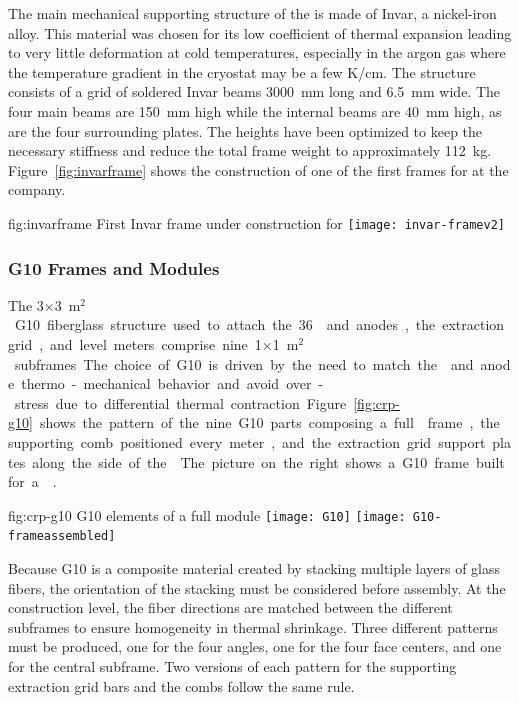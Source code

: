 The main mechanical supporting structure of the  is made of Invar, a nickel-iron alloy. This material was chosen for its low coefficient of thermal expansion leading to very little deformation at cold temperatures, especially in the argon gas where the temperature gradient in the cryostat may be a few \si{K/cm}.
The structure consists of a grid of soldered Invar beams \SI{3000}{mm} long and \SI{6.5}{mm} wide. The four main beams are \SI{150}{mm} high while the internal beams are \SI{40}{mm} high, as are the four surrounding plates. The heights have been optimized to keep the necessary stiffness and reduce the total frame weight to approximately \SI{112}{kg}.
 Figure~\ref{fig:invarframe} shows the construction of one of the first  frames for  at the company.
\begin{dunefigure}{fig:invarframe}
{First  Invar frame under construction for }
\texttt{[image: invar-framev2]}
\end{dunefigure}
 \subsubsection{G10 Frames and Modules}
\label{sec:invar-frame}

The \num{3}$\times$\SI{3}{m$^{2}$}  G10 fiberglass structure used to attach the \num{36}  and anodes, the extraction grid, and level meters comprise nine \num{1}$\times$\SI{1}{m$^{2}$} subframes. The choice of G10 is driven by the need to match the  and anode thermo-mechanical behavior and avoid over-stress due to differential thermal contraction. 
Figure~\ref{fig:crp-g10} shows the pattern of the nine G10 parts composing a full  frame, the supporting comb positioned every meter, and the extraction grid support plates along the side of the . The picture on the right shows a G10 frame built for a  .

\begin{dunefigure}{fig:crp-g10}
{G10 elements of a full  module}
\texttt{[image: G10]}
\texttt{[image: G10-frameassembled]}
\end{dunefigure}

Because G10 is a composite material created by stacking multiple layers of glass fibers, the orientation of the stacking must be considered before assembly.
At the construction level, the fiber directions are matched between the different subframes to ensure homogeneity in thermal shrinkage. Three different patterns must be produced, one for the four angles, one for the four face centers, and one for the central subframe.
Two versions of each pattern for the supporting extraction grid bars and the combs follow the same rule.

